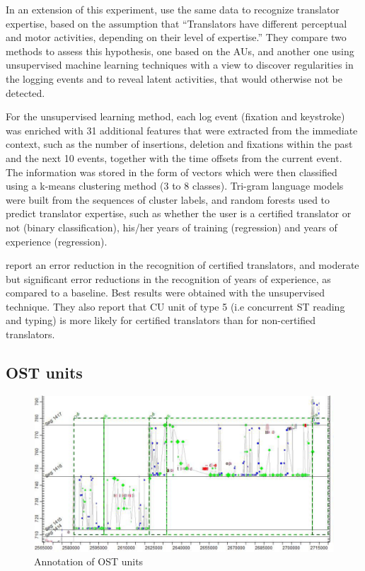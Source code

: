 \documentclass[output=paper]{LSP/langsci}
\begin{document}
In an extension of this experiment, \citet{MartinezGomez2014Recognition} use the same data to recognize translator expertise, based on the assumption that ``Translators have different perceptual and motor activities, depending on their level of expertise.'' They compare two methods to assess this hypothesis, one based on the AUs, and another one using unsupervised machine learning techniques with a view to discover regularities in the logging events and to reveal latent activities, that would otherwise not be detected.

For the unsupervised learning method, each log event (fixation and keystroke) was enriched with 31 additional features that were extracted from the  immediate context, such as the number of insertions, deletion and fixations within the past and the next 10 events, together with the time offsets from the current event. The information was stored in the form of vectors which were then classified using a k-means clustering method (3 to 8 classes). Tri-gram language models were built from the sequences of cluster labels, and random forests used to predict translator expertise, such as whether the user is a certified translator or not (binary classification), his/her years of training (regression) and years of experience (regression).

\citet{MartinezGomez2014Recognition} report an error reduction in the recognition of certified translators, and moderate but significant error reductions in the recognition of years of experience, as compared to a baseline. Best results were obtained with the unsupervised technique. They also report that CU unit of type 5 (i.e concurrent ST reading and typing) is more likely for certified translators than for non-certified translators.

\subsection{OST units}
\label{carl-schaeffer:sec:3.4}

\begin{figure}
 \includegraphics[width=\textwidth]{figures/carl-schaefer/sketch-img012.png} 
\caption{Annotation of OST units}
\label{carl-schaeffer:fig:ost}
\end{figure}
\end{document}
